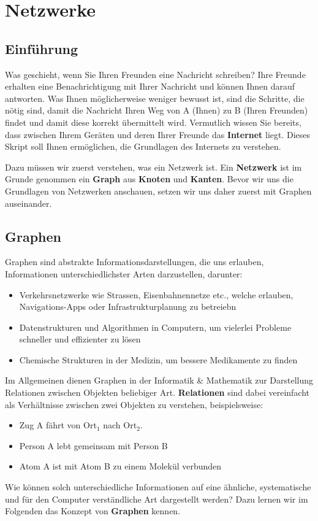 \chapter{Netzwerke}

\section{Einführung}
Was geschieht, wenn Sie Ihren Freunden eine Nachricht schreiben? Ihre Freunde erhalten eine Benachrichtigung mit Ihrer Nachricht und können Ihnen darauf antworten. Was Ihnen möglicherweise weniger bewusst ist, sind die Schritte, die nötig sind, damit die Nachricht Ihren Weg von A (Ihnen) zu B (Ihren Freunden) findet und damit diese korrekt übermittelt wird. Vermutlich wissen Sie bereits, dass zwischen Ihrem Geräten und deren Ihrer Freunde das \textbf{Internet} liegt. Dieses Skript soll Ihnen ermöglichen, die Grundlagen des Internets zu verstehen.

Dazu müssen wir zuerst verstehen, was ein Netzwerk ist. Ein \textbf{Netzwerk} ist im Grunde genommen ein \textbf{Graph} aus \textbf{Knoten} und \textbf{Kanten}. Bevor wir uns die Grundlagen von Netzwerken anschauen, setzen wir uns daher zuerst mit Graphen auseinander.

\section{Graphen}
Graphen sind abstrakte Informationsdarstellungen, die uns erlauben, Informationen unterschiedlichster Arten darzustellen, darunter:
\begin{itemize}
    \item Verkehrsnetzwerke wie Strassen, Eisenbahnennetze etc., welche erlauben, Navigations-Apps oder Infrastrukturplanung zu betreiebn
    \item Datenstrukturen und Algorithmen in Computern, um vielerlei Probleme schneller und effizienter zu lösen
    \item Chemische Strukturen in der Medizin, um bessere Medikamente zu finden
\end{itemize}

Im Allgemeinen dienen Graphen in der Informatik \& Mathematik zur Darstellung Relationen zwischen Objekten beliebiger Art. \textbf{Relationen} sind dabei vereinfacht als Verhältnisse zwischen zwei Objekten zu verstehen, beispielsweise:
\begin{itemize}
\item Zug A fährt von Ort$_1$ nach Ort$_2$.
\item Person A lebt gemeinsam mit Person B
\item Atom A ist mit Atom B zu einem Molekül verbunden
\end{itemize}
Wie können solch unterschiedliche Informationen auf eine ähnliche, systematische und für den Computer verständliche Art dargestellt werden? Dazu lernen wir im Folgenden das Konzept von \textbf{Graphen} kennen.
